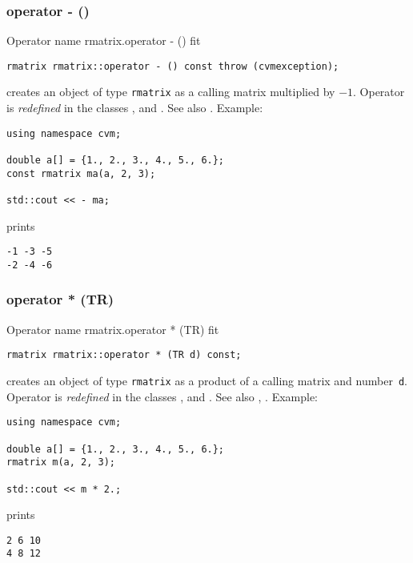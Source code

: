 \subsubsection{operator - ()}
Operator%
\pdfdest name {rmatrix.operator - ()} fit
\begin{verbatim}
rmatrix rmatrix::operator - () const throw (cvmexception);
\end{verbatim}
creates an object of type \verb"rmatrix" as
a calling matrix multiplied by $-1$.
Operator is \emph{redefined} in the classes
, 
and .
See also .
Example:
\begin{Verbatim}
using namespace cvm;

double a[] = {1., 2., 3., 4., 5., 6.};
const rmatrix ma(a, 2, 3);

std::cout << - ma;
\end{Verbatim}
prints
\begin{Verbatim}
-1 -3 -5
-2 -4 -6
\end{Verbatim}
\newpage



\subsubsection{operator * (TR)}
Operator%
\pdfdest name {rmatrix.operator * (TR)} fit
\begin{verbatim}
rmatrix rmatrix::operator * (TR d) const;
\end{verbatim}
creates an object of type \verb"rmatrix" as a product of
a calling matrix and  number~\verb"d".
Operator is \emph{redefined} in the classes
, 
and .
See also ,
.
Example:
\begin{Verbatim}
using namespace cvm;

double a[] = {1., 2., 3., 4., 5., 6.};
rmatrix m(a, 2, 3);

std::cout << m * 2.;
\end{Verbatim}
prints
\begin{Verbatim}
2 6 10
4 8 12
\end{Verbatim}
\newpage



